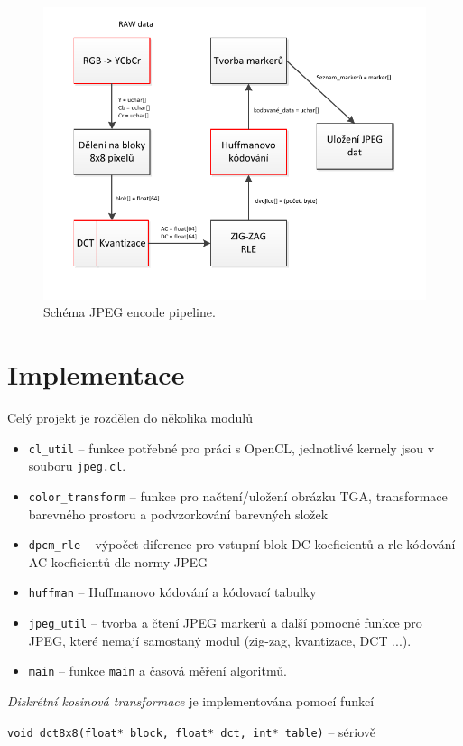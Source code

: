 \documentclass[11pt,a4paper]{article}
\begin{document}
\begin{figure}[H]
  \centering
  \includegraphics[width=15cm]{pipeline.pdf}
  \caption{Schéma JPEG encode pipeline.}
  \label{pipeline}
\end{figure}

\section{Implementace}
Celý projekt je rozdělen do několika modulů
\begin{itemize}
\item \texttt{cl\_util} -- funkce potřebné pro práci s OpenCL, jednotlivé kernely jsou v souboru \texttt{jpeg.cl}.
\item \texttt{color\_transform} -- funkce pro načtení/uložení obrázku TGA, transformace barevného prostoru a podvzorkování barevných složek 
\item \texttt{dpcm\_rle} -- výpočet diference pro vstupní blok DC koeficientů a rle kódování AC koeficientů dle normy JPEG
\item \texttt{huffman} -- Huffmanovo kódování a kódovací tabulky
\item \texttt{jpeg\_util} -- tvorba a čtení JPEG markerů a další pomocné funkce pro JPEG, které nemají samostaný
modul (zig-zag, kvantizace, DCT ...).
\item \texttt{main} -- funkce \texttt{main} a časová měření algoritmů.
\end{itemize}
\textit{Diskrétní kosinová transformace} je implementována pomocí funkcí

\texttt{void dct8x8(float* block, float* dct, int* table)} -- sériově
\end{document}
